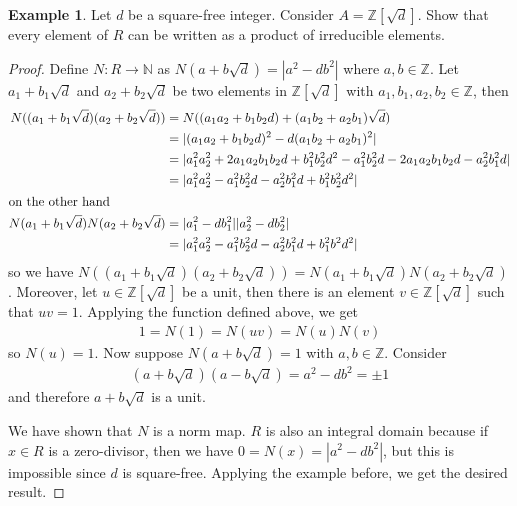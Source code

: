 \documentclass[a4paper]{book}
\theoremstyle{definition}
\newtheorem{example}{Example}[definition]
\begin{document}
\begin{example}
    Let \(d\) be a square-free integer. Consider \(A = \mathbb{Z}[\sqrt{d}]\). Show that every element of \(R\) can be written as a product of irreducible elements.
\end{example}
\begin{proof}
    Define \(N: R \longrightarrow \mathbb{N}\) as \(N(a + b \sqrt{d}) = |a^2 - d b^2|\) where \(a, b \in \mathbb{Z}\). Let \(a_1 + b_1 \sqrt{d}\) and \(a_2 + b_2 \sqrt{d}\) be two elements in \(\mathbb{Z}[\sqrt{d}]\) with \(a_1, b_1, a_2, b_2 \in \mathbb{Z}\), then
    \begin{align*}
        N((a_1 + b_1 \sqrt{d}) (a_2 + b_2 \sqrt{d})) &= N((a_1 a_2 + b_1 b_2 d) + (a_1 b_2 + a_2 b_1) \sqrt{d}) \\
        &= |(a_1 a_2 + b_1 b_2 d)^2 - d (a_1 b_2 + a_2 b_1)^2| \\
        &= |a_1^2 a_2^2 + 2 a_1 a_2 b_1 b_2 d + b_1^2 b_2^2 d^2 - a_1^2 b_2^2 d - 2 a_1 a_2 b_1 b_2 d - a_2^2 b_1^2 d | \\
        &= |a_1^2 a_2^2 - a_1^2 b_2^2 d - a_2^2 b_1^2 d + b_1^2 b_2^2 d^2| \\
        \intertext{on the other hand}
        N(a_1 + b_1 \sqrt{d})N(a_2 + b_2 \sqrt{d}) &= |a_1^2 - d b_1^2||a_2^2 - d b_2^2| \\
        &= |a_1^2 a_2^2 - a_1^2 b_2^2 d - a_2^2 b_1^2 d + b_1^2 b^2 d^2 |
    \end{align*}
    so we have \(N((a_1 + b_1 \sqrt{d}) (a_2 + b_2 \sqrt{d})) = N(a_1 + b_1 \sqrt{d})N(a_2 + b_2 \sqrt{d})\). Moreover, let \(u \in \mathbb{Z}[\sqrt{d}]\) be a unit, then there is an element \(v \in \mathbb{Z}[\sqrt{d}]\) such that \(u v = 1\). Applying the function defined above, we get
    \begin{align*}
        1 = N(1) = N(u v) = N(u) N(v)
    \end{align*}
    so \(N(u) = 1\). Now suppose \(N(a + b \sqrt{d}) = 1\) with \(a, b \in \mathbb{Z}\). Consider
    \begin{align*}
        (a + b \sqrt{d})(a - b \sqrt{d}) = a^2 - d b^2 = \pm 1
    \end{align*}
    and therefore \(a + b \sqrt{d}\) is a unit.

    We have shown that \(N\) is a norm map. \(R\) is also an integral domain because if \(x \in R\) is a zero-divisor, then we have \(0 = N(x) = |a^2 - d b^2|\), but this is impossible since \(d\) is square-free. Applying the example before, we get the desired result.
\end{proof}
\end{document}
